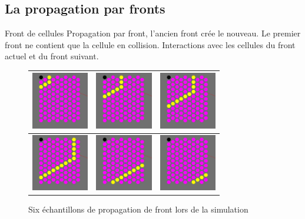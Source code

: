 \documentclass{beamer}
\begin{document}
\subsection{La propagation par fronts}
\begin{frame}{Front de cellules}
  Propagation par front, l’ancien front crée le nouveau.
  Le premier front ne contient que la cellule en collision.
  Interactions avec les cellules du front actuel et du front suivant.
  \begin{figure}
    \begin{tabular}{|M|M|M|}
      \hline
      \includegraphics[width=2.5cm]{Images/front_1.png} &
      \includegraphics[width=2.5cm]{Images/front_2.png} &
      \includegraphics[width=2.5cm]{Images/front_3.png} \\
      \hline
      \includegraphics[width=2.5cm]{Images/front_4.png} &
      \includegraphics[width=2.5cm]{Images/front_5.png} &
      \includegraphics[width=2.5cm]{Images/front_6.png} \\
      \hline
    \end{tabular}
    \caption{Six échantillons de propagation de front lors de la simulation}
  \end{figure}
\end{frame}
\end{document}
